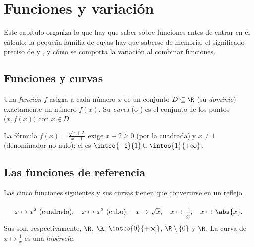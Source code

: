 \chapter{Funciones y variación}\label{ch:g11:func}

Este capítulo organiza lo que hay que saber sobre funciones antes de
entrar en el cálculo: la pequeña familia de \emph{}
cuyas  hay que saberse de memoria, el significado preciso de
\emph{} y \emph{}, y cómo se comporta la variación al
combinar funciones.

\section{Funciones y curvas}

\begin{definition}\label{def:g11:func:function}
Una \emph{función} $f$ asigna a cada número $x$ de un
conjunto $D \subseteq \R$ (su \emph{dominio}) exactamente
un número $f(x)$. Su \emph{curva} (o ) es el conjunto de los puntos
$\bigl(x, f(x)\bigr)$ con $x \in D$.
\end{definition}

\begin{example}
La fórmula $f(x) = \frac{\sqrt{x+2}}{x-1}$ exige $x + 2 \geq 0$ (por la
 cuadrada) y $x \neq 1$ (denominador no nulo): el  es
$\intco{-2}{1} \cup \intoo{1}{+\infty}$.
\end{example}

\section{Las funciones de referencia}

Las cinco funciones siguientes y sus curvas tienen que convertirse en un
reflejo.

\begin{definition}\label{def:g11:func:reference}
\[
x \mapsto x^2 \text{ (cuadrado)}, \quad
x \mapsto x^3 \text{ (cubo)}, \quad
x \mapsto \sqrt{x}, \quad
x \mapsto \frac{1}{x}, \quad
x \mapsto \abs{x}.
\]
Sus  son, respectivamente, $\R$, $\R$, $\intco{0}{+\infty}$,
$\R \setminus \{0\}$ y $\R$. La curva de $x \mapsto \frac1x$ es una
\emph{hipérbola}.
\end{definition}

